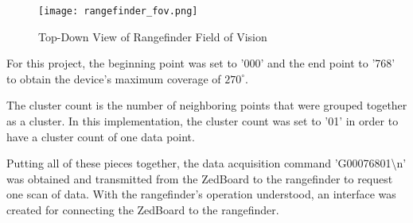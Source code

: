 \begin{figure}[H]
	\centerline{\texttt{[image: rangefinder\_fov.png]}}
	\caption{Top-Down View of Rangefinder Field of Vision \cite{urg04lx_datasheet}}
	\label{rangefinder_fov}
\end{figure}

For this project, the beginning point was set to '000' and the end point to '768' to obtain the device's maximum coverage of $270^\circ$.
\par
The cluster count is the number of neighboring points that were grouped together as a cluster. In this implementation, the cluster count was set to '01' in order to have a cluster count of one data point.
\par
Putting all of these pieces together, the data acquisition command 'G00076801\textbackslash{}n' was obtained and transmitted from the ZedBoard to the rangefinder to request one scan of data. With the rangefinder's operation understood, an interface was created for connecting the ZedBoard to the rangefinder.




